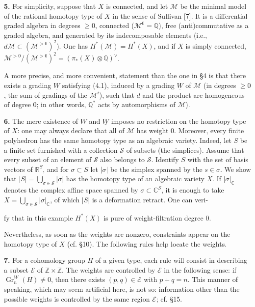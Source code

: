 \documentclass[8pt]{extarticle}
\newcommand{\DSourceFolio}{--}
\newcommand{\DAuthorityPage}{--}
\newcommand{\SourcePage}[2]{%
  \renewcommand{\DSourceFolio}{#1}%
  \renewcommand{\DAuthorityPage}{#2}%
  \thispagestyle{dpage}%
}
\newcommand{\EndSourcePage}{\clearpage}
\newcommand{\ReaderFont}{\fontsize{7.35}{8.15}\selectfont}
\newcommand{\NumPara}[1]{\par\noindent\textbf{#1}\enspace}
\newcommand{\Q}{\mathbb{Q}}
\newcommand{\C}{\mathbb{C}}
\newcommand{\R}{\mathbb{R}}
\newcommand{\Z}{\mathbb{Z}}
\newcommand{\Gr}{\operatorname{Gr}}
\newcommand{\Wg}{\underline{W}}
\newcommand{\region}{\mathscr{E}}
\newcommand{\Mmin}{\mathscr{M}}
\newcommand{\Simp}{\mathscr{S}}
\begin{document}
\NumPara{5.} For simplicity, suppose that \(X\) is connected, and let \(\Mmin\) be the minimal model of the rational homotopy type of \(X\) in the sense of Sullivan [7]. It is a differential graded algebra in degrees \(\ge0\), connected (\(\Mmin^0=\Q\)), free (anti)commutative as a graded algebra, and generated by its indecomposable elements (i.e., \(d\Mmin\subset(\Mmin^{>0})^2\)). One has \(H^*(\Mmin)=H^*(X)\), and if \(X\) is simply connected, \(\Mmin^{>0}/(\Mmin^{>0})^2=(\pi_*(X)\otimes\Q)^\vee\).

A more precise, and more convenient, statement than the one in §4 is that there exists a grading \(\Wg\) satisfying (4.1), induced by a grading \(\Wg\) of \(\Mmin\) (in degrees \(\ge0\), the sum of gradings of the \(\Mmin^i\)), such that \(d\) and the product are homogeneous of degree 0; in other words, \(\Q^*\) acts by automorphisms of \(\Mmin\)).

\NumPara{6.} The mere existence of \(W\) and \(\Wg\) imposes no restriction on the homotopy type of \(X\): one may always declare that all of \(\Mmin\) has weight 0. Moreover, every finite polyhedron has the same homotopy type as an algebraic variety. Indeed, let \(S\) be a finite set furnished with a collection \(\Simp\) of subsets (the simplices). Assume that every subset of an element of \(\Simp\) also belongs to \(\Simp\). Identify \(S\) with the set of basis vectors of \(\R^S\), and for \(\sigma\subset S\) let \(|\sigma|\) be the simplex spanned by the \(s\in\sigma\). We show that \(|S|=\bigcup_{\sigma\in\Simp}|\sigma|\) has the homotopy type of an algebraic variety \(X\). If \(|\sigma|_{\C}\) denotes the complex affine space spanned by \(\sigma\subset\C^S\), it is enough to take \(X=\bigcup_{\sigma\in\Simp}|\sigma|_{\C}\), of which \(|S|\) is a deformation retract. One can veri-
\EndSourcePage


\SourcePage{82}{4}
\ReaderFont
fy that in this example \(H^*(X)\) is pure of weight-filtration degree 0.

Nevertheless, as soon as the weights are nonzero, constraints appear on the homotopy type of \(X\) (cf. §10). The following rules help locate the weights.

\NumPara{7.} For a cohomology group \(H\) of a given type, each rule will consist in describing a subset \(\region\) of \(\Z\times\Z\). The weights are controlled by \(\region\) in the following sense: if \(\Gr_n^W(H)\ne0\), then there exists \((p,q)\in\region\) with \(p+q=n\). This manner of speaking, which may seem artificial here, is not so: information other than the possible weights is controlled by the same region \(\region\); cf. §15.
\end{document}
